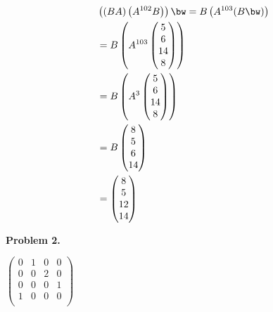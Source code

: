 \documentclass[oneside,12pt]{amsart}
\begin{document}
\begin{align*}
&\left((BA) \left(A^{102}  B\right) \right ) \bw = B \left (A^{103} (B \bw) \right) \\
&= B \left( A^{103}
\begin{pmatrix}
5 \\
6 \\
14 \\
8 \\
\end{pmatrix}
\right) \\
&= B \left( A^{3}
\begin{pmatrix}
5 \\
6 \\
14 \\
8 \\
\end{pmatrix}
\right) \\
&= B
\begin{pmatrix}
8 \\
5 \\
6 \\
14
\end{pmatrix} \\
&=
\begin{pmatrix}
8 \\
5 \\
12 \\
14
\end{pmatrix}
\end{align*}

\textbf{Problem 2.}

\smallskip

$
\begin{pmatrix}
0 & 1 & 0 & 0\\
0 & 0 & 2 & 0\\
0 & 0 & 0 & 1\\
1 & 0 & 0 & 0\\
\end{pmatrix}
$
\end{document}
